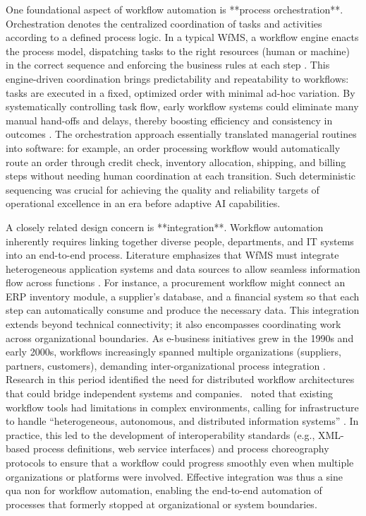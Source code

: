 One foundational aspect of workflow automation is **process orchestration**. Orchestration denotes the centralized coordination of tasks and activities according to a defined process logic. In a typical WfMS, a workflow engine enacts the process model, dispatching tasks to the right resources (human or machine) in the correct sequence and enforcing the business rules at each step \parencite{basuResearch2002}. This engine-driven coordination brings predictability and repeatability to workflows: tasks are executed in a fixed, optimized order with minimal ad-hoc variation. By systematically controlling task flow, early workflow systems could eliminate many manual hand-offs and delays, thereby boosting efficiency and consistency in outcomes \parencite{stohrWorkflow2001}. The orchestration approach essentially translated managerial routines into software: for example, an order processing workflow would automatically route an order through credit check, inventory allocation, shipping, and billing steps without needing human coordination at each transition. Such deterministic sequencing was crucial for achieving the quality and reliability targets of operational excellence in an era before adaptive AI capabilities.

A closely related design concern is **integration**. Workflow automation inherently requires linking together diverse people, departments, and IT systems into an end-to-end process. Literature emphasizes that WfMS must integrate heterogeneous application systems and data sources to allow seamless information flow across functions \parencite{stohrWorkflow2001}. For instance, a procurement workflow might connect an ERP inventory module, a supplier's database, and a financial system so that each step can automatically consume and produce the necessary data. This integration extends beyond technical connectivity; it also encompasses coordinating work across organizational boundaries. As e-business initiatives grew in the 1990s and early 2000s, workflows increasingly spanned multiple organizations (suppliers, partners, customers), demanding inter-organizational process integration \parencite{basuResearch2002}. Research in this period identified the need for distributed workflow architectures that could bridge independent systems and companies.~\textcite{georgakopoulosOverview1995} noted that existing workflow tools had limitations in complex environments, calling for infrastructure to handle “heterogeneous, autonomous, and distributed information systems” \parencite{georgakopoulosOverview1995}. In practice, this led to the development of interoperability standards (e.g., XML-based process definitions, web service interfaces) and process choreography protocols to ensure that a workflow could progress smoothly even when multiple organizations or platforms were involved. Effective integration was thus a sine qua non for workflow automation, enabling the end-to-end automation of processes that formerly stopped at organizational or system boundaries.

